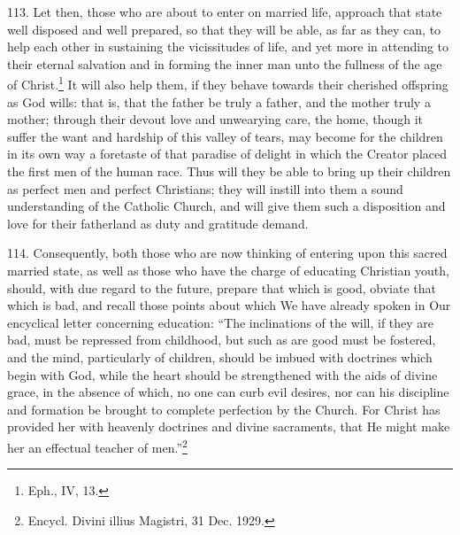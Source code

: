 \documentclass[12pt,a4paper]{book}
\begin{document}
113. Let then, those who are about to enter on married life, approach that state well disposed and well prepared, so that they will be able, as far as they can, to help each other in sustaining the vicissitudes of life, and yet more in attending to their eternal salvation and in forming the inner man unto the fullness of the age of Christ.\footnote{Eph., IV, 13.} It will also help them, if they behave towards their cherished offspring as God wills: that is, that the father be truly a father, and the mother truly a mother; through their devout love and unwearying care, the home, though it suffer the want and hardship of this valley of tears, may become for the children in its own way a foretaste of that paradise of delight in which the Creator placed the first men of the human race. Thus will they be able to bring up their children as perfect men and perfect Christians; they will instill into them a sound understanding of the Catholic Church, and will give them such a disposition and love for their fatherland as duty and gratitude demand.

114. Consequently, both those who are now thinking of entering upon this sacred married state, as well as those who have the charge of educating Christian youth, should, with due regard to the future, prepare that which is good, obviate that which is bad, and recall those points about which We have already spoken in Our encyclical letter concerning education: ``The inclinations of the will, if they are bad, must be repressed from childhood, but such as are good must be fostered, and the mind, particularly of children, should be imbued with doctrines which begin with God, while the heart should be strengthened with the aids of divine grace, in the absence of which, no one can curb evil desires, nor can his discipline and formation be brought to complete perfection by the Church. For Christ has provided her with heavenly doctrines and divine sacraments, that He might make her an effectual teacher of men.''\footnote{Encycl. Divini illius Magistri, 31 Dec. 1929.}
\end{document}
